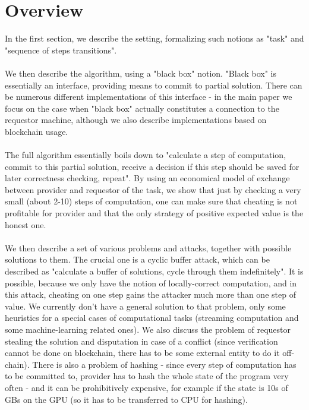 \documentclass{winnower}
\begin{document}
\section{Overview}
In the first section, we describe the setting, formalizing such notions as "task" and "sequence of steps transitions".\\
\\
We then describe the algorithm, using a "black box" notion. "Black box" is essentially an interface, providing means to commit to partial solution. There can be numerous different implementations of this interface - in the main paper we focus on the case when "black box" actually constitutes a connection to the requestor machine, although we also describe implementations based on blockchain usage.\\
\\
The full algorithm essentially boils down to "calculate a step of computation, commit to this partial solution, receive a decision if this step should be saved for later correctness checking, repeat". By using an economical model of exchange between provider and requestor of the task, we show that just by checking a very small (about 2-10) steps of computation, one can make sure that cheating is not profitable for provider and that the only strategy of positive expected value is the honest one.\\
\\
We then describe a set of various problems and attacks, together with possible solutions to them. The crucial one is a cyclic buffer attack, which can be described as "calculate a buffer of solutions, cycle through them indefinitely". It is possible, because we only have the notion of locally-correct computation, and in this attack, cheating on one step gains the attacker much more than one step of value. We  currently don't have a general solution to that problem, only some heuristics for a special cases of computational tasks (streaming computation and some machine-learning related ones). We also discuss the problem of requestor stealing the solution and disputation in case of a conflict (since verification cannot be done on blockchain, there has to be some external entity to do it off-chain). There is also a problem of hashing - since every step of computation has to be committed to, provider has to hash the whole state of the program very often - and it can be prohibitively expensive, for example if the state is 10s of GBs on the GPU (so it has to be transferred to CPU for hashing). \\
\end{document}
